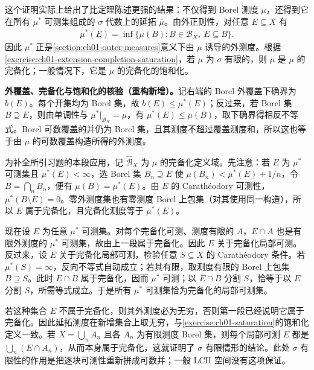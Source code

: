 \documentclass[../../main.tex]{subfiles}
\begin{document}
这个证明实际上给出了比定理陈述更强的结果：不仅得到 Borel 测度 $\mu$，还得到它在所有 $\mu^*$ 可测集组成的 $\sigma$ 代数上的延拓 $\overline\mu$。由外正则性，对任意 $E\subseteq X$ 有
\begin{align*}
\mu^*(E)=\inf\{\mu(B):B\in\mathscr B_X,\ E\subseteq B\}.
\end{align*}
因此 $\mu^*$ 正是\cref{section:ch01-outer-measures}意义下由 $\mu$ 诱导的外测度。根据\cref{exercise:ch01-extension-completion-saturation}，若 $\mu$ 为 $\sigma$ 有限的，则 $\overline\mu$ 是 $\mu$ 的完备化；一般情况下，它是 $\mu$ 的完备化的饱和化。
\begin{remark}
\textbf{外覆盖、完备化与饱和化的核验（重构新增）。}记右端的 Borel 外覆盖下确界为 $b(E)$。每个开集均为 Borel 集，故 $b(E)\leqslant\mu^*(E)$；反过来，若 Borel 集 $B\supseteq E$，则由单调性与 $\mu^*|_{\mathscr B_X}=\mu$，有 $\mu^*(E)\leqslant\mu(B)$，取下确界得相反不等式。Borel 可数覆盖的并仍为 Borel 集，且其测度不超过覆盖测度和，所以这也等于由 $\mu$ 的可数覆盖构造所得的外测度。

为补全所引习题的本段应用，记 $\widehat{\mathscr B}_X$ 为 $\mu$ 的完备化定义域。先注意：若 $E$ 为 $\mu^*$ 可测集且 $\mu^*(E)<\infty$，选 Borel 集 $B_n\supseteq E$ 使 $\mu(B_n)<\mu^*(E)+1/n$，令 $B=\bigcap_nB_n$，便有 $\mu(B)=\mu^*(E)$。由 $E$ 的 Carathéodory 可测性，$\mu^*(B\setminus E)=0$。零外测度集也有零测度 Borel 上包集（对其使用同一构造），所以 $E$ 属于完备化，且完备化测度等于 $\mu^*(E)$。

现在设 $E$ 为任意 $\mu^*$ 可测集。对每个完备化可测、测度有限的 $A$，$E\cap A$ 也是有限外测度的 $\mu^*$ 可测集，故由上一段属于完备化。因此 $E$ 关于完备化局部可测。反过来，设 $E$ 关于完备化局部可测，检验任意 $S\subseteq X$ 的 Carathéodory 条件。若 $\mu^*(S)=\infty$，反向不等式自动成立；若其有限，取测度有限的 Borel 上包集 $B\supseteq S$。此时 $E\cap B$ 属于完备化，因而 $\mu^*$ 可测；以 $E\cap B$ 分割 $S$，恰等于以 $E$ 分割 $S$，所需等式成立。于是所有 $\mu^*$ 可测集恰为完备化的局部可测集。

若这种集合 $E$ 不属于完备化，则其外测度必为无穷，否则第一段已经说明它属于完备化。因此延拓测度在新增集合上取无穷，与\cref{exercise:ch01-saturation}的饱和化定义一致。若 $X=\bigcup_n A_n$ 且各 $A_n$ 为有限测度 Borel 集，则每个局部可测 $E$ 都是 $\bigcup_n(E\cap A_n)$，从而本身属于完备化，这就证明了 $\sigma$ 有限情形的结论。此处 $\sigma$ 有限性的作用是把逐块可测性重新拼成可数并；一般 LCH 空间没有这项保证。
\end{remark}
\end{document}
